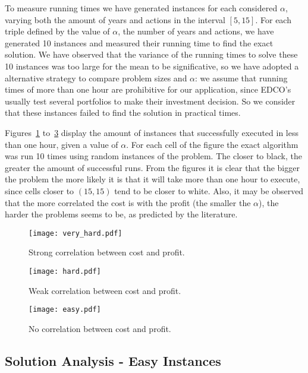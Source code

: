 To measure running times we have generated instances for each considered $\alpha$, varying both the amount of years and actions
in the interval $[5,15]$. For each triple defined by the value of $\alpha$, the number of years and actions,
we have generated 10 instances and measured their running time to find the exact solution. 
We have observed that the variance of the running times to solve these 10 instances was too large
for the mean to be significative, so we have adopted a alternative strategy to compare problem sizes
and $\alpha$:
we assume that running times of more than one hour are prohibitive for our application, since
EDCO's usually test several portfolios to make their investment decision. So we consider that
these instances failed to find the solution in practical times.

Figures~\ref{fig:time1} to~\ref{fig:time3} display the amount of instances that successfully executed in less than one hour,
given a value of $\alpha$. For each cell of the figure the exact algorithm was run 10 times using random instances of the problem.
The closer to black, the greater the amount of successful runs. 
From the figures it is clear that the bigger the problem the more likely it is that it will take more than one hour to execute, 
since cells closer to $(15,15)$ tend to be closer to white.
Also, it may be observed that the more
correlated the cost is with the profit (the smaller the $\alpha$),
the harder the problems seems to be, as predicted by the literature.

\begin{figure}
\centering
\texttt{[image: very\_hard.pdf]}
\caption{Strong correlation between cost and profit.}
\label{fig:time1}
\end{figure}

\begin{figure}
\centering
\texttt{[image: hard.pdf]}
\caption{Weak correlation between cost and profit. \\ $\,$ }
\label{fig:time2}
\end{figure}

\begin{figure}
\centering
\texttt{[image: easy.pdf]}
\caption{No correlation between cost and profit.}
\label{fig:time3}
\end{figure}


\subsection{Solution Analysis - Easy Instances}

